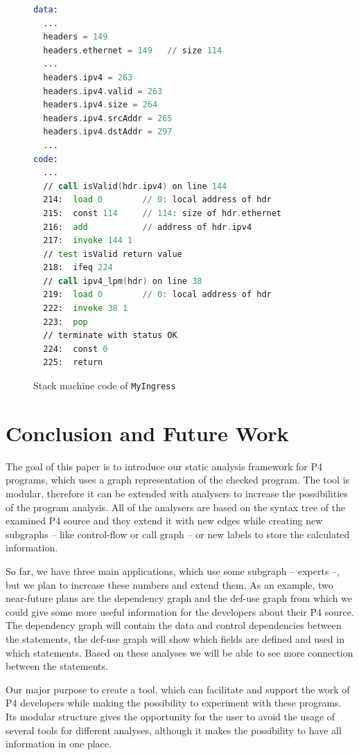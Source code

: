 \documentclass[sigconf]{acmart}
\begin{document}
  \begin{figure}
  \begin{lstlisting}[language=asm]
data:
  ...
  headers = 149 
  headers.ethernet = 149   // size 114
  ...
  headers.ipv4 = 263 
  headers.ipv4.valid = 263 
  headers.ipv4.size = 264 
  headers.ipv4.srcAddr = 265 
  headers.ipv4.dstAddr = 297
  ...
code:
  ...
  // call isValid(hdr.ipv4) on line 144
  214:  load 0	      // 0: local address of hdr
  215:  const 114     // 114: size of hdr.ethernet
  216:  add           // address of hdr.ipv4
  217:  invoke 144 1		 
  // test isValid return value
  218:  ifeq 224		 
  // call ipv4_lpm(hdr) on line 38
  219:  load 0        // 0: local address of hdr
  222:  invoke 38 1		 
  223:  pop
  // terminate with status OK
  224:  const 0		 
  225:  return 
\end{lstlisting}
\caption{Stack machine code of \texttt{MyIngress}}
  \label{code:stack}
\end{figure}
  
	\section{Conclusion and Future Work}
	
	The goal of this paper is to introduce our static analysis framework for P4 programs, which uses a graph representation of the checked program. The tool is modular, therefore it can be extended with analysers to increase the possibilities of the program analysis. All of the analysers are based on the syntax tree of the examined P4 source and they extend it with new edges while creating new subgraphs -- like control-flow or call graph -- or new labels to store the calculated information.
	 
	So far, we have three main applications, which use some subgraph -- experts --, but we plan to increase these numbers and extend them. As an example, two near-future plans are the dependency graph and the def-use graph from which we could give some more useful information for the developers about their P4 source. The dependency graph will contain the data and control dependencies between the statements, the def-use graph will show which fields are defined and used in which statements. Based on these analyses we will be able to see more connection between the statements.		
	
	Our major purpose to create a tool, which can facilitate and support the work of  P4 developers while making the possibility to experiment with these programs. Its modular structure gives the opportunity for the user to avoid the usage of several tools for different analyses, although it makes the possibility to have all information in one place. 



\end{document}
